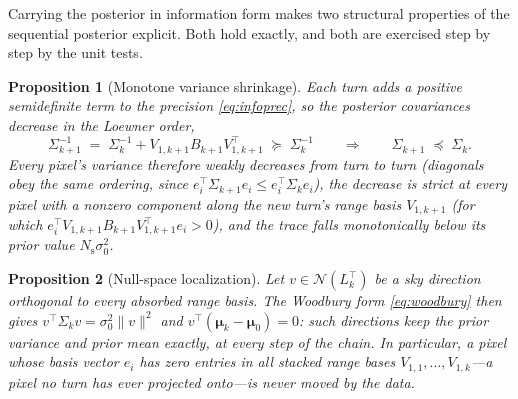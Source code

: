 \documentclass[11pt,a4paper]{article}
\newtheorem{proposition}{Proposition}
\newcommand{\Ns}{N_{\mathrm{s}}}
\begin{document}
Carrying the posterior in information form makes two structural properties of
the sequential posterior explicit. Both hold exactly, and both are exercised
step by step by the unit tests.

\begin{proposition}[Monotone variance shrinkage]
\label{prop:shrink}
Each turn adds a positive semidefinite term to the precision
\eqref{eq:infoprec}, so the posterior covariances decrease in the Loewner
order,
\begin{equation}
  \Sigma_{k+1}^{-1} \;=\; \Sigma_k^{-1} + V_{1,k+1}B_{k+1}V_{1,k+1}^{\!\top}
  \;\succeq\; \Sigma_k^{-1}
  \qquad\Longrightarrow\qquad
  \Sigma_{k+1} \;\preceq\; \Sigma_k .
\end{equation}
Every pixel's variance therefore weakly decreases from turn to turn
(diagonals obey the same ordering, since
$e_i^{\!\top}\Sigma_{k+1}e_i\le e_i^{\!\top}\Sigma_ke_i$), the decrease is
strict at every pixel with a nonzero component along the new turn's range
basis $V_{1,k+1}$ (for which $e_i^{\!\top}V_{1,k+1}B_{k+1}V_{1,k+1}^{\!\top}
e_i>0$), and the trace falls monotonically below its prior value
$\Ns\sigma_0^2$.
\end{proposition}

\begin{proposition}[Null-space localization]
\label{prop:localize}
Let $v\in\mathcal{N}(L_k^{\!\top})$ be a sky direction orthogonal to every
absorbed range basis. The Woodbury form \eqref{eq:woodbury} then gives
$v^{\!\top}\Sigma_k v=\sigma_0^2\|v\|^2$ and
$v^{\!\top}(\boldsymbol{\mu}_k-\boldsymbol{\mu}_0)=0$: such directions keep
the prior variance and prior mean \emph{exactly}, at every step of the chain.
In particular, a pixel whose basis vector $e_i$ has zero entries in all
stacked range bases $V_{1,1},\dots,V_{1,k}$---a pixel no turn has ever
projected onto---is never moved by the data.
\end{proposition}
\end{document}
